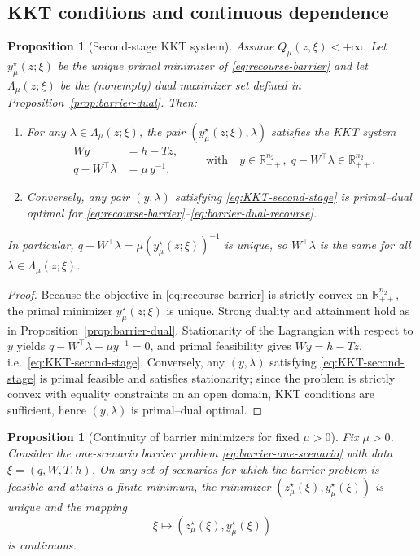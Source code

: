 \documentclass[11pt]{article}
\theoremstyle{plain}
\newtheorem{proposition}[theorem]{Proposition}
\theoremstyle{definition}
\theoremstyle{remark}
\begin{document}
\subsection{KKT conditions and continuous dependence}\label{subsec:barrier:kkt}

\begin{proposition}[Second-stage KKT system]\label{prop:second-stage-kkt}
Assume $Q_\mu(z,\xi)<+\infty$. Let $y_\mu^\star(z;\xi)$ be the unique primal minimizer of
\eqref{eq:recourse-barrier} and let $\Lambda_\mu(z;\xi)$ be the (nonempty) dual maximizer set defined in
Proposition~\ref{prop:barrier-dual}. Then:
\begin{enumerate}
\item For any $\lambda\in\Lambda_\mu(z;\xi)$, the pair $(y_\mu^\star(z;\xi),\lambda)$ satisfies the KKT system
\begin{equation}\label{eq:KKT-second-stage}
\begin{aligned}
Wy &= h-Tz,\\
q-W^\top\lambda &= \mu\,y^{-1},
\end{aligned}
\qquad\text{with}\quad y\in\mathbb{R}^{n_2}_{++},\;q-W^\top\lambda\in\mathbb{R}^{n_2}_{++}.
\end{equation}
\item Conversely, any pair $(y,\lambda)$ satisfying \eqref{eq:KKT-second-stage} is primal--dual optimal
for \eqref{eq:recourse-barrier}--\eqref{eq:barrier-dual-recourse}.
\end{enumerate}
In particular, $q-W^\top\lambda=\mu(y_\mu^\star(z;\xi))^{-1}$ is unique, so $W^\top\lambda$ is the same
for all $\lambda\in\Lambda_\mu(z;\xi)$.
\end{proposition}

\begin{proof}
Because the objective in \eqref{eq:recourse-barrier} is strictly convex on $\mathbb{R}^{n_2}_{++}$, the primal
minimizer $y_\mu^\star(z;\xi)$ is unique. Strong duality and attainment hold as in
Proposition~\ref{prop:barrier-dual}. Stationarity of the Lagrangian with respect to $y$ yields
$q-W^\top\lambda-\mu y^{-1}=0$, and primal feasibility gives $Wy=h-Tz$, i.e.\ \eqref{eq:KKT-second-stage}.
Conversely, any $(y,\lambda)$ satisfying \eqref{eq:KKT-second-stage} is primal feasible and satisfies
stationarity; since the problem is strictly convex with equality constraints on an open domain, KKT
conditions are sufficient, hence $(y,\lambda)$ is primal--dual optimal.
\end{proof}

\begin{proposition}[Continuity of barrier minimizers for fixed $\mu>0$]\label{prop:IFT}
Fix $\mu>0$. Consider the one-scenario barrier problem \eqref{eq:barrier-one-scenario} with data
$\xi=(q,W,T,h)$. On any set of scenarios for which the barrier problem is feasible and attains a finite
minimum, the minimizer $(z_\mu^\star(\xi),y_\mu^\star(\xi))$ is unique and the mapping
\[
\xi \longmapsto (z_\mu^\star(\xi),y_\mu^\star(\xi))
\]
is continuous.
\end{proposition}
\end{document}
